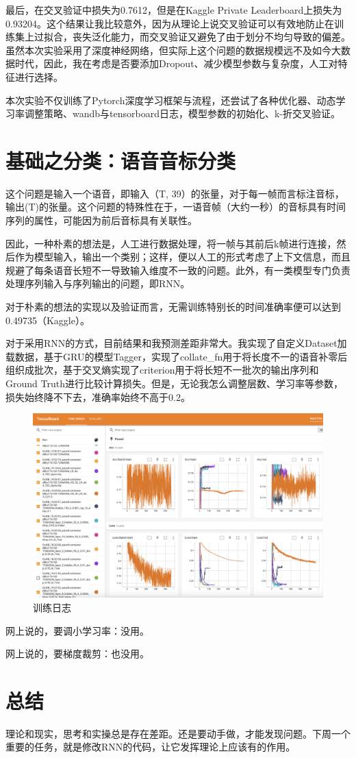 \documentclass[a4paper,12pt]{ctexart}
\begin{document}
最后，在交叉验证中损失为0.7612，但是在Kaggle Private Leaderboard上损失为0.93204。这个结果让我比较意外，因为从理论上说交叉验证可以有效地防止在训练集上过拟合，丧失泛化能力，而交叉验证又避免了由于划分不均匀导致的偏差。虽然本次实验采用了深度神经网络，但实际上这个问题的数据规模远不及如今大数据时代，因此，我在考虑是否要添加Dropout、减少模型参数与复杂度，人工对特征进行选择。

本次实验不仅训练了Pytorch深度学习框架与流程，还尝试了各种优化器、动态学习率调整策略、wandb与tensorboard日志，模型参数的初始化、k-折交叉验证。

\section{基础之分类：语音音标分类}

这个问题是输入一个语音，即输入（T, 39）的张量，对于每一帧而言标注音标，输出(T)的张量。这个问题的特殊性在于，一语音帧（大约一秒）的音标具有时间序列的属性，可能因为前后音标具有关联性。

因此，一种朴素的想法是，人工进行数据处理，将一帧与其前后k帧进行连接，然后作为模型输入，输出一个类别；这样，便以人工的形式考虑了上下文信息，而且规避了每条语音长短不一导致输入维度不一致的问题。此外，有一类模型专门负责处理序列输入与序列输出的问题，即RNN。

对于朴素的想法的实现以及验证而言，无需训练特别长的时间准确率便可以达到0.49735（Kaggle）。

对于采用RNN的方式，目前结果和我预测差距非常大。我实现了自定义Dataset加载数据，基于GRU的模型Tagger，实现了collate\_fn用于将长度不一的语音补零后组织成批次，基于交叉熵实现了criterion用于将长短不一批次的输出序列和Ground Truth进行比较计算损失。但是，无论我怎么调整层数、学习率等参数，损失始终降不下去，准确率始终不高于0.2。

\begin{figure}[htbp]
    \centering
    \includegraphics[width=0.9\linewidth]{TB.png}
    \caption{训练日志}
\end{figure}

网上说的，要调小学习率：没用。

网上说的，要梯度裁剪：也没用。

\section{总结}
理论和现实，思考和实操总是存在差距。还是要动手做，才能发现问题。下周一个重要的任务，就是修改RNN的代码，让它发挥理论上应该有的作用。



\end{document}
